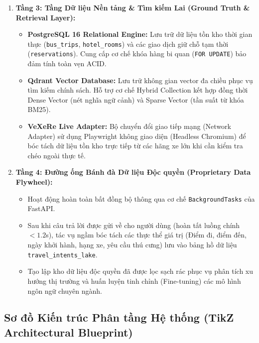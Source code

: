 \begin{enumerate}
    \item \textbf{Tầng 3: Tầng Dữ liệu Nền tảng \& Tìm kiếm Lai (Ground Truth \& Retrieval Layer):}
    \begin{itemize}
        \item \textbf{PostgreSQL 16 Relational Engine:} Lưu trữ dữ liệu tồn kho thời gian thực (\texttt{bus\_trips}, \texttt{hotel\_rooms}) và các giao dịch giữ chỗ tạm thời (\texttt{reservations}). Cung cấp cơ chế khóa hàng bi quan (\texttt{FOR UPDATE}) bảo đảm tính toàn vẹn ACID.
        \item \textbf{Qdrant Vector Database:} Lưu trữ không gian vector đa chiều phục vụ tìm kiếm chính sách. Hỗ trợ cơ chế Hybrid Collection kết hợp đồng thời Dense Vector (nét nghĩa ngữ cảnh) và Sparse Vector (tần suất từ khóa BM25).
        \item \textbf{VeXeRe Live Adapter:} Bộ chuyển đổi giao tiếp mạng (Network Adapter) sử dụng Playwright không giao diện (Headless Chromium) để bóc tách dữ liệu tồn kho trực tiếp từ các hãng xe lớn khi cần kiểm tra chéo ngoài thực tế.
    \end{itemize}

    \item \textbf{Tầng 4: Đường ống Bánh đà Dữ liệu Độc quyền (Proprietary Data Flywheel):}
    \begin{itemize}
        \item Hoạt động hoàn toàn bất đồng bộ thông qua cơ chế \texttt{BackgroundTasks} của FastAPI.
        \item Sau khi câu trả lời được gửi về cho người dùng (hoàn tất luồng chính $< 1.2$s), tác vụ ngầm bóc tách các thực thể giá trị (Điểm đi, điểm đến, ngày khởi hành, hạng xe, yêu cầu thú cưng) lưu vào bảng hồ dữ liệu \texttt{travel\_intents\_lake}.
        \item Tạo lập kho dữ liệu độc quyền đã được lọc sạch rác phục vụ phân tích xu hướng thị trường và huấn luyện tinh chỉnh (Fine-tuning) các mô hình ngôn ngữ chuyên ngành.
    \end{itemize}
\end{enumerate}

\subsection{Sơ đồ Kiến trúc Phân tầng Hệ thống (TikZ Architectural Blueprint)}
\label{subsec:tikz_architecture}

